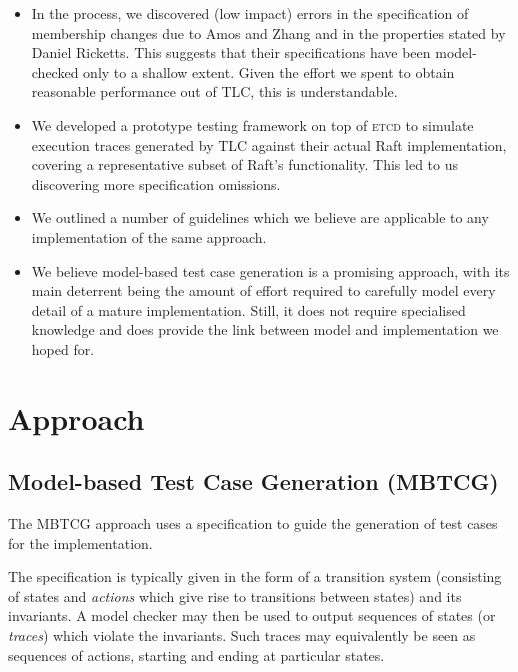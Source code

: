 \documentclass[a4paper]{article}
\newcommand{\tname}[1]{\textsc{#1}\xspace}
\newcommand{\etcd}{\tname{etcd}}
\begin{document}
\begin{itemize}
    \item In the process, we discovered (low impact) errors in the
    specification of membership changes due to Amos and Zhang and in the
    properties stated by Daniel Ricketts.
    This suggests that their specifications have been model-checked only to a shallow extent.
    Given the effort we spent to obtain reasonable performance out of TLC, this is understandable.

    \item We developed a prototype testing framework on top of \etcd to simulate execution traces generated by TLC against their actual Raft implementation, covering a representative subset of Raft's functionality.
    This led to us discovering more specification omissions.

    \item We outlined a number of guidelines which we believe are applicable to any implementation of the same approach.

    \item We believe model-based test case generation is a promising approach, with its main deterrent being the amount of effort required to carefully model every detail of a mature implementation. Still, it does not require specialised knowledge and does provide the link between model and implementation we hoped for.

\end{itemize}


\section{Approach}

\subsection{Model-based Test Case Generation (MBTCG)}
\label{sec: interpreter}

The MBTCG approach uses a specification to guide the generation of test cases for the implementation.

The specification is typically given in the form of a transition system (consisting of states and \emph{actions} which give rise to transitions between states) and its invariants.
%
A model checker may then be used to output sequences of states (or \emph{traces}) which violate the invariants.
%
Such traces may equivalently be seen as sequences of actions, starting and ending at particular states.
\end{document}
